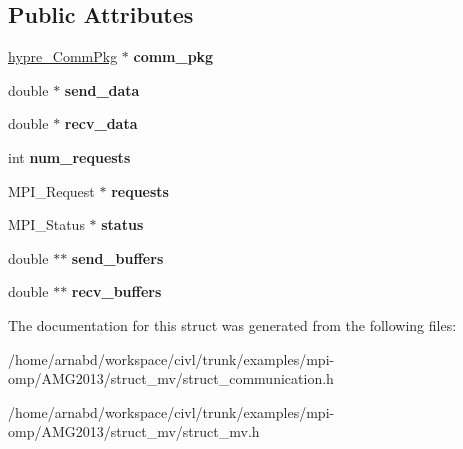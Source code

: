 \subsection*{Public Attributes}
\begin{DoxyCompactItemize}
\item 
\hypertarget{structhypre__CommHandle__struct_aa4a36d473df8d2e22ea9e71835ddefff}{}\hyperlink{structhypre__CommPkg__struct}{hypre\+\_\+\+Comm\+Pkg} $\ast$ {\bfseries comm\+\_\+pkg}\label{structhypre__CommHandle__struct_aa4a36d473df8d2e22ea9e71835ddefff}

\item 
\hypertarget{structhypre__CommHandle__struct_abdce65f43be5df00ae0f767ed0022936}{}double $\ast$ {\bfseries send\+\_\+data}\label{structhypre__CommHandle__struct_abdce65f43be5df00ae0f767ed0022936}

\item 
\hypertarget{structhypre__CommHandle__struct_a5628ad76b94c0fa88234b0dcc99b4069}{}double $\ast$ {\bfseries recv\+\_\+data}\label{structhypre__CommHandle__struct_a5628ad76b94c0fa88234b0dcc99b4069}

\item 
\hypertarget{structhypre__CommHandle__struct_a266b3d78666e03840780c1cbf1e5e199}{}int {\bfseries num\+\_\+requests}\label{structhypre__CommHandle__struct_a266b3d78666e03840780c1cbf1e5e199}

\item 
\hypertarget{structhypre__CommHandle__struct_a92375695c497bee8dcbcde20483a1538}{}M\+P\+I\+\_\+\+Request $\ast$ {\bfseries requests}\label{structhypre__CommHandle__struct_a92375695c497bee8dcbcde20483a1538}

\item 
\hypertarget{structhypre__CommHandle__struct_ac353c10927c81195e0768de077f2c6a4}{}M\+P\+I\+\_\+\+Status $\ast$ {\bfseries status}\label{structhypre__CommHandle__struct_ac353c10927c81195e0768de077f2c6a4}

\item 
\hypertarget{structhypre__CommHandle__struct_aebf50a45ae127de70595a7610b562b43}{}double $\ast$$\ast$ {\bfseries send\+\_\+buffers}\label{structhypre__CommHandle__struct_aebf50a45ae127de70595a7610b562b43}

\item 
\hypertarget{structhypre__CommHandle__struct_aefa7bd78aefc9e8b128df9577c6af885}{}double $\ast$$\ast$ {\bfseries recv\+\_\+buffers}\label{structhypre__CommHandle__struct_aefa7bd78aefc9e8b128df9577c6af885}

\end{DoxyCompactItemize}


The documentation for this struct was generated from the following files\+:\begin{DoxyCompactItemize}
\item 
/home/arnabd/workspace/civl/trunk/examples/mpi-\/omp/\+A\+M\+G2013/struct\+\_\+mv/struct\+\_\+communication.\+h\item 
/home/arnabd/workspace/civl/trunk/examples/mpi-\/omp/\+A\+M\+G2013/struct\+\_\+mv/struct\+\_\+mv.\+h\end{DoxyCompactItemize}
